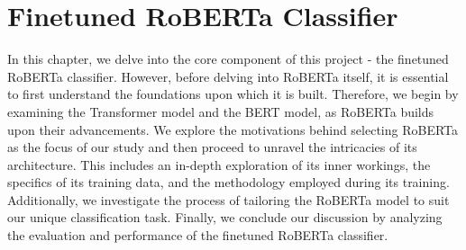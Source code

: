 \documentclass[a4paper,12pt]{report} %
\begin{document}
\chapter{Finetuned RoBERTa Classifier}
In this chapter, we delve into the core component of this project - the finetuned RoBERTa classifier. However, before delving into RoBERTa itself, it is essential to first understand the foundations upon which it is built. Therefore, we begin by examining the Transformer model and the BERT model, as RoBERTa builds upon their advancements. We explore the motivations behind selecting RoBERTa as the focus of our study and then proceed to unravel the intricacies of its architecture. This includes an in-depth exploration of its inner workings, the specifics of its training data, and the methodology employed during its training. Additionally, we investigate the process of tailoring the RoBERTa model to suit our unique classification task. Finally, we conclude our discussion by analyzing the evaluation and performance of the finetuned RoBERTa classifier.
\end{document}
